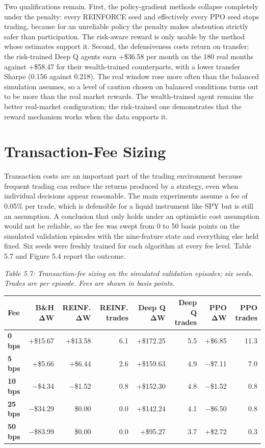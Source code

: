 Two qualifications remain. First, the policy-gradient methods
collapse completely under the penalty: every REINFORCE seed and
effectively every PPO seed stops trading, because for an unreliable
policy the penalty makes abstention strictly safer than participation.
The risk-aware reward is only usable by the method whose estimates
support it. Second, the defensiveness costs return on transfer: the
risk-trained Deep Q agents earn +\$36.58 per month on the 180 real
months against +\$58.47 for their wealth-trained counterparts, with a
lower transfer Sharpe (0.156 against 0.218). The real window rose more
often than the balanced simulation assumes, so a level of caution chosen
on balanced conditions turns out to be more than the real market
rewards. The wealth-trained
agent remains the better real-market configuration; the risk-trained one
demonstrates that the reward mechanism works when the data supports it.

\section{Transaction-Fee Sizing}

Transaction costs are an important part of the trading environment
because frequent trading can reduce the returns produced by a strategy,
even when individual decisions appear reasonable. The main experiments
assume a fee of 0.05\% per trade, which is defensible for a liquid
instrument like SPY but is still an assumption. A conclusion that only
holds under an optimistic cost assumption would not be reliable, so the
fee was swept from 0 to 50 basis points on the simulated validation
episodes with the nine-feature state and everything else held fixed.
Six seeds were freshly trained for each algorithm at every fee level.
Table 5.7 and Figure 5.4 report the outcome.

\emph{Table 5.7: Transaction-fee sizing on the simulated validation
episodes; six seeds. Trades are per episode. Fees are shown in basis
points.}

{\def\LTcaptype{none}
\begin{longtable}[]{@{}lrrrrrrr@{}}
\toprule\noalign{}
\textbf{Fee} & \textbf{B\&H ΔW} & \textbf{REINF. ΔW} &
\textbf{REINF. trades} & \textbf{Deep Q ΔW} & \textbf{Deep Q trades} &
\textbf{PPO ΔW} & \textbf{PPO trades} \\
\midrule\noalign{}
\endhead
\bottomrule\noalign{}
\endlastfoot
\textbf{0 bps} & +\$15.67 & +\$13.58 & 6.1 & +\$172.25 & 5.5 & +\$6.85 & 11.3 \\
\rowsep
\textbf{5 bps} & +\$5.66 & +\$6.44 & 2.6 & +\$159.63 & 4.9 & −\$7.11 & 7.0 \\
\rowsep
\textbf{10 bps} & −\$4.34 & −\$1.52 & 0.8 & +\$152.30 & 4.8 & −\$1.52 & 0.8 \\
\rowsep
\textbf{25 bps} & −\$34.29 & \$0.00 & 0.0 & +\$142.24 & 4.1 & −\$6.50 & 0.8 \\
\rowsep
\textbf{50 bps} & −\$83.99 & \$0.00 & 0.0 & +\$95.27 & 3.7 & +\$2.72 & 0.3 \\
\end{longtable}
}

